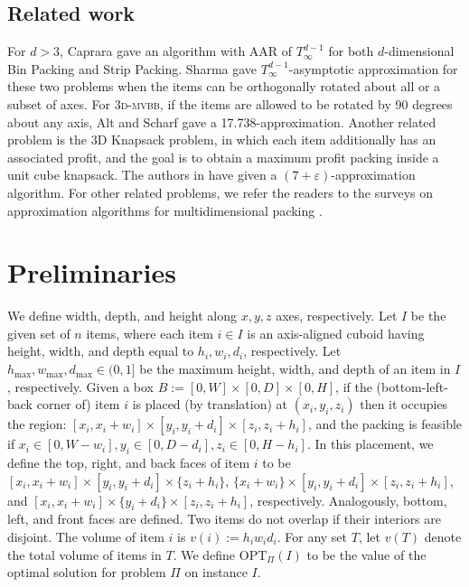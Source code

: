 \documentclass[a4paper,UKenglish,cleveref, autoref, thm-restate]{lipics-v2021}
\newcommand{\opt}{\mathrm{OPT}}
\newcommand{\tmvc}{\textsc{3d-mvbb}\xspace}
\begin{document}
\subsection{Related work}
For $d>3$, Caprara \cite{caprara2008packing} gave an algorithm with AAR of $T_{\infty}^{d-1}$ for both $d$-dimensional Bin Packing and Strip Packing. 
Sharma \cite{Sharma21}  gave $T_{\infty}^{d-1}$-asymptotic approximation for these two problems when the items
can be orthogonally rotated about all or a subset of axes.
For \tmvc, if the items are allowed to be rotated by 90 degrees about any axis, Alt and Scharf \cite{alt2018approximating} gave a 17.738-approximation.
Another related problem is the 3D Knapsack problem, in which each item additionally has an associated profit, and the goal is to obtain a maximum profit packing inside a unit cube knapsack. The authors in \cite{3d-knapsack-diedrich} have given a $(7+\varepsilon)$-approximation algorithm. For other related problems, we refer the readers to the surveys on approximation algorithms for multidimensional packing \cite{alt2016computational,christensen2016multidimensional}.





\section{Preliminaries}
\label{sec:prelim}
We define width, depth, and height along $x,y,z$ axes, respectively.  
Let $I$ be the given set of $n$ items, where each item $i\in I$ is an axis-aligned cuboid having height, width, and depth equal to $h_i, w_i, d_i$, 
respectively. Let $h_{\max}, w_{\max}, d_{\max} \in (0,1]$ be the maximum height, width, and depth of an item in $I$, respectively. 
Given a box $B:=[0,W]\times [0,D] \times [0,H]$, if the (bottom-left-back corner of) item $i$ is placed (by translation) at $(x_i, y_i, z_i)$ then it occupies the region: $[x_i, x_i+w_i] \times [y_i, y_i+d_i] \times [z_i, z_i+h_i]$, and the packing is feasible if $x_i \in [0,W-w_i],  y_i \in [0,D-d_i],  z_i \in [0,H-h_i]$. 
In this placement, we define the top, right, and back faces of item $i$ to be $[x_i,x_i+w_i]\times[y_i, y_i+d_i]\times\{z_i+h_i\}$, $\{x_i+w_i\}\times[y_i, y_i+d_i]\times[z_i, z_i+h_i]$, and $[x_i, x_i+w_i]\times\{y_i+d_i\}\times[z_i, z_i+h_i]$, respectively. Analogously, bottom, left, and front faces are defined.
Two items do not overlap if their interiors are disjoint. 
The volume of item $i$ is $v(i):=h_i w_i d_i$. 
For any set $T$, let $v(T)$ denote the total volume of items in $T$. We define $\opt_{\Pi}(I)$ to be the value of the optimal solution for problem $\Pi$ on instance $I$.
\end{document}
